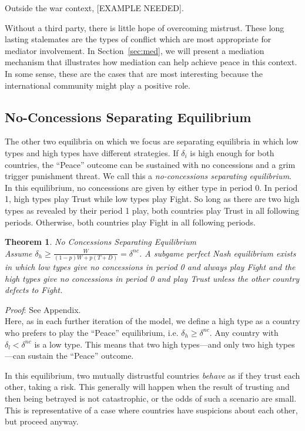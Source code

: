\documentclass[12pt, letterpaper]{article}
\newcommand{\de}{\delta}
\newtheorem{theorem}{Theorem}
\begin{document}
Outside the war context, [EXAMPLE NEEDED].

Without a third party, there is little hope of overcoming mistrust. These long lasting stalemates are the types of conflict which are most appropriate for mediator involvement. In Section~\ref{sec:med}, we will present a mediation mechanism that illustrates how mediation can help achieve peace in this context. In some sense, these are the cases that are most interesting because the international community might play a positive role. 

\subsection{No-Concessions Separating Equilibrium}
\label{sec:ncse}
The other two equilibria on which we focus are separating equilibria in which low types and high types have different strategies. If $\delta_i$ is high enough for both countries, the ``Peace'' outcome can be sustained with no concessions and a grim trigger punishment threat. We call this a \emph{no-concessions separating equilibrium}. In this equilibrium, no concessions are given by either type in period 0. In period 1, high types play Trust while low types play Fight. So long as there are two high types as revealed by their period 1 play, both countries play Trust in all following periods. Otherwise, both countries play Fight in all following periods. 

\begin{theorem}
\emph{No Concessions Separating Equilibrium}\\
	Assume $\delta_h \geq \frac{W}{(1-p)W + p(T+D)}=\de^{nc}$. A subgame perfect Nash equilibrium exists in which low types give no concessions in period 0 and always play Fight and the high types give no concessions in period 0 and play Trust unless the other country defects to Fight.
	\label{theorem:1}
\end{theorem}
\emph{Proof}: See Appendix.
\\
Here, as in each further iteration of the model, we define a high type as a country who prefers to play the ``Peace'' equilibrium, i.e. $\delta_h \geq \delta^{nc}$. Any country with $\delta_l < \delta^{nc}$ is a low type. This means that two high types---and only two high types---can sustain the ``Peace'' outcome.

In this equilibrium, two mutually distrustful countries \emph{behave} as if they trust each other, taking a risk. This generally will happen when the result of trusting and then being betrayed is not catastrophic, or the odds of such a scenario are small. This is representative of a case where countries have suspicions about each other, but proceed anyway. 
\end{document}

